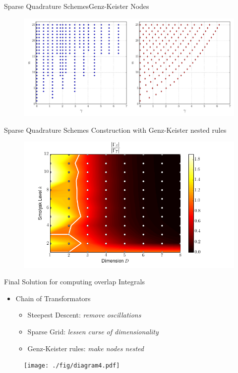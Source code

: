 \documentclass{beamer}
\newcommand{\cemph}[1]{\emph{\color{orange} #1}}
\begin{document}
\begin{frame}{Sparse Quadrature Schemes}{Genz-Keister Nodes}
  \begin{figure}
    \centering
    \includegraphics[width=\textwidth]{./fig/genz_keister_nodes.pdf}
  \end{figure}
\end{frame}


\begin{frame}{Sparse Quadrature Schemes}
  Construction with Genz-Keister nested rules
  \begin{figure}
    \centering
    \includegraphics[width=0.8\linewidth]{./fig/smolyak_genzkeister_ratiomap.png}
  \end{figure}
\end{frame}


\begin{frame}{Final Solution for computing overlap Integrals}
  \begin{itemize}
    \item Chain of Transformators
    \begin{itemize}
      \item Steepest Descent: \cemph{remove oscillations}
      \item Sparse Grid: \cemph{lessen curse of dimensionality}
      \item Genz-Keister rules: \cemph{make nodes nested}
    \end{itemize}
  \end{itemize}
  \begin{figure}
    \centering
    \texttt{[image: ./fig/diagram4.pdf]}
  \end{figure}
\end{frame}
\end{document}
